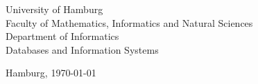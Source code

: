\begin{titlepage}
	\vspace{0.5cm}

	\begin{center}
		\vfill
		
		University of Hamburg\\
		Faculty of Mathematics, Informatics and Natural Sciences\\
		Department of Informatics\\
		Databases and Information Systems
		
		\vspace{1cm}
		
		Hamburg, \today
	\end{center}
\end{titlepage}

\restoregeometry

\begingroup
  \pagestyle{empty}
  \cleardoublepage
\endgroup
